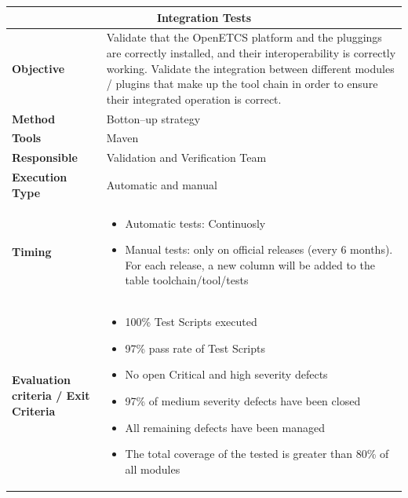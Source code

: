 \begin{center}
\begin{longtable}[H]{|p{4cm}|p{9cm}|}\hline
\multicolumn{2}{|c|}{\textbf{Integration Tests}}\\\hline
\textbf{Objective} &  Validate that the OpenETCS platform and the pluggings are correctly installed, and their interoperability is correctly working. Validate the integration between different modules / plugins that make up the tool chain in order to ensure their integrated operation is correct.\\\hline
\textbf{Method} & Botton–up strategy \\\hline
\textbf{Tools} & Maven\\\hline
\textbf{Responsible} & Validation and Verification Team\\\hline
\textbf{Execution Type} & Automatic and manual\\\hline
\textbf{Timing} & \begin{itemize}
\item Automatic tests: Continuosly
\item Manual tests: only on official releases (every 6 months). For each release, a new column will be added to the table toolchain/tool/tests
\end{itemize}  \\\hline
\textbf{Evaluation criteria / Exit Criteria} & \begin{itemize}
\item 100\% Test Scripts executed
\item 97\% pass rate of Test Scripts
\item No open Critical and high severity defects
\item 97\% of medium severity defects have been closed 
\item All remaining defects have been managed
\item The total coverage of the tested is greater than 80\% of all modules
\end{itemize} \\\hline
\end{longtable}
\end{center}

